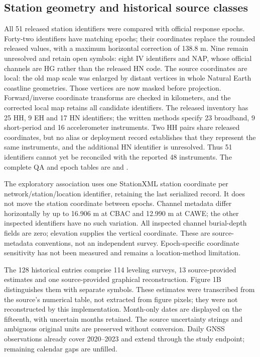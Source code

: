 \subsection*{Station geometry and historical source classes}
All 51 released station identifiers were compared with official response epochs. Forty-two identifiers have matching epochs; their coordinates replace the rounded released values, with a maximum horizontal correction of 138.8 m. Nine remain unresolved and retain open symbols: eight IV identifiers and NAP, whose official channels are HG rather than the released HN code. The source coordinates are local: the old map scale was enlarged by distant vertices in whole Natural Earth coastline geometries. Those vertices are now masked before projection. Forward/inverse coordinate transforms are checked in kilometers, and the corrected local map retains all candidate identifiers. The released inventory has 25 HH, 9 EH and 17 HN identifiers; the written methods specify 23 broadband, 9 short-period and 16 accelerometer instruments. Two HH pairs share released coordinates, but no alias or deployment record establishes that they represent the same instruments, and the additional HN identifier is unresolved. Thus 51 identifiers cannot yet be reconciled with the reported 48 instruments. The complete QA and epoch tables are  and .

The exploratory association uses one StationXML station coordinate per network/station/location identifier, retaining the last serialized record. It does not move the station coordinate between epochs. Channel metadata differ horizontally by up to 16.906 m at CBAC and 12.990 m at CAWE; the other inspected identifiers have no such variation. All inspected channel burial-depth fields are zero; elevation supplies the vertical coordinate. These are source-metadata conventions, not an independent survey. Epoch-specific coordinate sensitivity has not been measured and remains a location-method limitation.

The 128 historical entries comprise 114 leveling surveys, 13 source-provided estimates and one source-provided graphical reconstruction. Figure 1B distinguishes them with separate symbols. These estimates were transcribed from the source's numerical table, not extracted from figure pixels; they were not reconstructed by this implementation. Month-only dates are displayed on the fifteenth, with uncertain months retained. The source uncertainty strings and ambiguous original units are preserved without conversion. Daily GNSS observations already cover 2020--2023 and extend through the study endpoint; remaining calendar gaps are unfilled.

